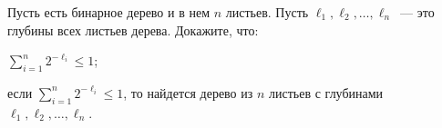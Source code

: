 Пусть есть бинарное дерево и в нем $n$ листьев. Пусть $\ell_1, \ell_2, \dots, \ell_n$~--- это глубины всех листьев
дерева. Докажите, что:
\begin{enumcyr}
    \item $\sum\limits_{i = 1}^n 2^{-\ell_i} \le 1$;
    \item если $\sum\limits_{i = 1}^n 2^{-\ell_i} \le 1$, то найдется дерево из $n$ листьев с глубинами $\ell_1, \ell_2, \dots,
	    \ell_n$.
\end{enumcyr}